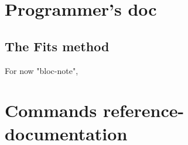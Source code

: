 \part{Programmer's doc}
















\COM
{
\chapter{The Fits method}

For now "bloc-note",

}


\part{Commands reference-documentation}





